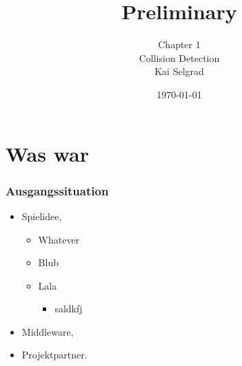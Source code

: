 \documentclass{beamer}
\title{Preliminary}
\author{Chapter 1\\Collision Detection\\Kai Selgrad}
\date{\today}
\begin{document}
\frame{\titlepage}


\section{Was war}
\frame
{
	\frametitle{Ausgangssituation}
	\begin{itemize}
	\item Spielidee,
		\begin{itemize}
		\item Whatever
		\item Blub
		\item Lala
			\begin{itemize}
			\item saldkfj
			\end{itemize}

		\end{itemize}

	\item Middleware,
	\item Projektpartner.
	\end{itemize}
}
\end{document}
